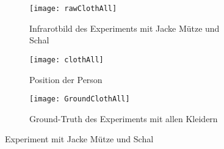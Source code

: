 \begin{figure}[H]
	\begin{subfigure}{.45\linewidth}
		\centering
		\texttt{[image: rawClothAll]}
		\caption{Infrarotbild des Experiments mit Jacke Mütze und Schal}
		\label{fig:rawClothAll}
	\end{subfigure}
	\begin{subfigure}{.45\linewidth}
		\centering
		\texttt{[image: clothAll]}
		\caption{Position der Person}
		\label{fig:AlgorithmsClothAll}
	\end{subfigure}
	\begin{subfigure}{\linewidth}
		\centering
		\texttt{[image: GroundClothAll]}
		\caption{Ground-Truth des Experiments mit allen Kleidern}
		\label{fig:groundTruthClothAll}
	\end{subfigure}
	\caption{Experiment mit Jacke Mütze und Schal}
	\label{fig:AllCloth}
\end{figure}

